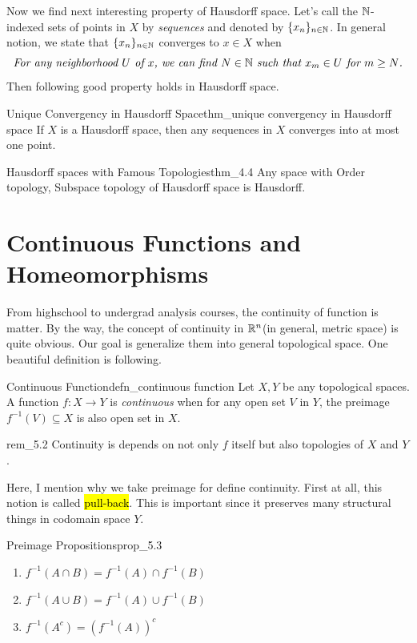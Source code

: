 \documentclass[12pt, a4paper, twoside]{article}
\theoremstyle{plain}
\begin{document}
Now we find next interesting property of Hausdorff space. Let's call the ${\mathbb {N}}$-indexed sets of points in $X$ by \textit{sequences} and denoted by $\{x_n\}_{n \in {\mathbb {N}}}$. 
In general notion, we state that $\{x_n\}_{n \in {\mathbb {N}}}$ converges to $x \in X$ when 
\[\textit{For any neighborhood $U$ of $x$, we can find $N \in {\mathbb {N}}$ such that $x_m \in U$ for $m \geq N$.}\]
Then following good property holds in Hausdorff space. 

\begin{thm}{Unique Convergency in Hausdorff Space}{thm_unique convergency in Hausdorff space}
    If $X$ is a Hausdorff space, then any sequences in $X$ converges into at most one point.
\end{thm}

\begin{thm}{Hausdorff spaces with Famous Topologies}{thm_4.4}
    Any space with Order topology, Subspace topology of Hausdorff space is Hausdorff. 
\end{thm}

\newpage 

\section{Continuous Functions and Homeomorphisms}

From highschool to undergrad analysis courses, the continuity of function is matter. 
By the way, the concept of continuity in ${\mathbb {R}}^n$(in general, metric space) is quite obvious.
Our goal is generalize them into general topological space. One beautiful definition is following. 

\begin{defn}{Continuous Function}{defn_continuous function}
    Let $X, Y$ be any topological spaces. A function $f: X \rightarrow Y$ is \textit{continuous} 
    when for any open set $V$ in $Y$, the preimage $f^{-1}(V) \subseteq X$ is also open set in $X$. 
\end{defn}

\begin{rem}{}{rem_5.2}
    Continuity is depends on not only $f$ itself but also topologies of $X$ and $Y$. 
\end{rem}

Here, I mention why we take preimage for define continuity. First at all, this notion is called 
\hl{pull-back}. This is important since it preserves many structural things in codomain space $Y$. 

\begin{prop}{Preimage Propositions}{prop_5.3}
\begin{enumerate}
    \item $f^{-1}(A \cap B) = f^{-1}(A) \cap f^{-1}(B)$
    \item $f^{-1}(A \cup B) = f^{-1}(A) \cup f^{-1}(B) $
    \item $f^{-1}(A^c) = \left(f^{-1}(A)\right)^c$
\end{enumerate}
\end{prop}
\end{document}
